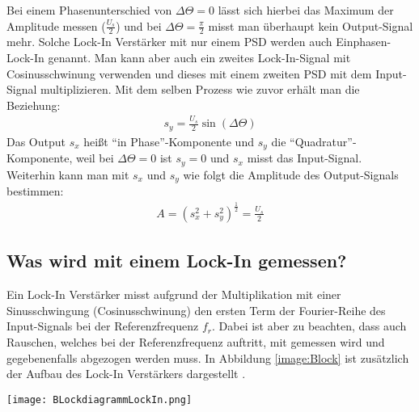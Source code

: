 Bei einem Phasenunterschied von $\Delta\Theta = 0$ lässt sich hierbei das Maximum der Amplitude messen ($\frac{U_s}{2}$) und bei $\Delta\Theta = \frac{\pi}{2}$ misst man überhaupt kein Output-Signal mehr. Solche Lock-In Verstärker mit nur einem PSD werden auch Einphasen-Lock-In genannt. Man kann aber auch ein zweites Lock-In-Signal mit Cosinusschwinung verwenden und dieses mit einem zweiten PSD mit dem Input-Signal multiplizieren. Mit dem selben Prozess wie zuvor erhält man die Beziehung:
\begin{gather}
    s_{y} = \frac{U_s}{2} \sin(\Delta\Theta) 
\end{gather} 
Das Output $s_x$ heißt \enquote{in Phase}-Komponente und $s_y$ die \enquote{Quadratur}-Komponente, weil bei $\Delta\Theta = 0$ ist $s_y = 0$ und $s_x$ misst das Input-Signal.\\

Weiterhin kann man mit $s_x$ und $s_y$ wie folgt die Amplitude des Output-Signals bestimmen:
\begin{gather}
    A = (s_x^2 + s_y^2)^{\frac{1}{2}} = \frac{U_s}{2}
\end{gather}
\subsection*{Was wird mit einem Lock-In gemessen?}
Ein Lock-In Verstärker misst aufgrund der Multiplikation mit einer Sinusschwingung (Cosinusschwinung) den ersten Term der Fourier-Reihe des Input-Signals bei der Referenzfrequenz $f_r$. Dabei ist aber zu beachten, dass auch Rauschen, welches bei der Referenzfrequenz auftritt, mit gemessen wird und gegebenenfalls abgezogen werden muss. In Abbildung \ref{image:Block} ist zusätzlich der Aufbau des Lock-In Verstärkers dargestellt \citep{lockin}.
\newpage
\begin{center}
    \texttt{[image: BLockdiagrammLockIn.png]}
    \label{image:Block}
\end{center}

\newpage
